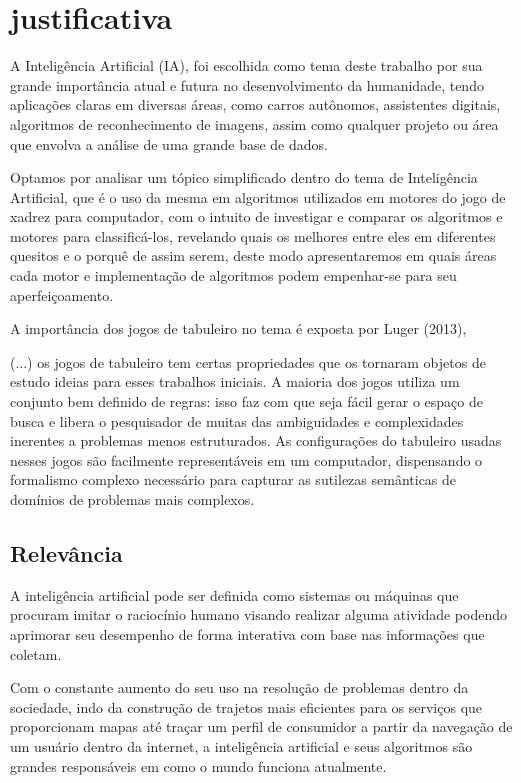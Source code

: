 \chapter{justificativa}

A Inteligência Artificial (IA), foi escolhida como tema deste trabalho por sua grande importância atual e futura no
desenvolvimento da humanidade, tendo aplicações claras em diversas áreas, como carros autônomos, assistentes digitais,
algoritmos de reconhecimento de imagens, assim como qualquer projeto ou área que envolva a análise de uma grande base de
dados.


Optamos por analisar um tópico simplificado dentro do tema de Inteligência Artificial, que é o uso da mesma em algoritmos
utilizados em motores do jogo de xadrez para computador, com o intuito de investigar e comparar os algoritmos e motores para
classificá-los, revelando quais os melhores entre eles em diferentes quesitos e o porquê de assim serem, deste modo
apresentaremos em quais áreas cada motor e implementação de algoritmos podem empenhar-se para seu aperfeiçoamento.


A importância dos jogos de tabuleiro no tema é exposta por Luger (2013),
\begin{citacao}
    (...) os jogos de tabuleiro tem certas propriedades que os tornaram objetos de estudo ideias para esses trabalhos iniciais.
    A maioria dos jogos utiliza um conjunto bem definido de regras: isso faz com que seja fácil gerar o espaço de busca e
    libera o pesquisador de muitas das ambiguidades e complexidades inerentes a problemas menos estruturados.
    As configurações do tabuleiro usadas nesses jogos são facilmente representáveis em um computador,
    dispensando o formalismo complexo necessário para capturar as sutilezas semânticas de domínios de problemas mais
    complexos. \cite[p.17]{luger}
\end{citacao}

\section{Relevância}
A inteligência artificial pode ser definida como sistemas ou máquinas que procuram imitar o raciocínio humano visando realizar
alguma atividade podendo aprimorar seu desempenho de forma interativa com base nas informações que coletam.

Com o constante aumento do seu uso na resolução de problemas dentro da sociedade, indo da construção de trajetos mais
eficientes para os serviços que proporcionam mapas até traçar um perfil de consumidor a partir da navegação de um usuário
dentro da internet, a inteligência artificial e seus algoritmos são grandes responsáveis em como o mundo funciona atualmente.

